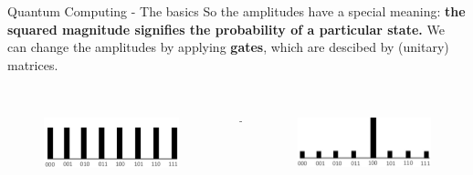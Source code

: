 \documentclass{beamer}
\begin{document}
{\begin{frame}{Quantum Computing - The basics}
	So the amplitudes have a special meaning: \textbf{the squared magnitude signifies the probability of a particular state.} We can change the amplitudes by applying \textbf{gates}, which are descibed by (unitary) matrices.\\~\\
	
	\pause
	\begin{columns}
		\begin{column}{0.4\textwidth}  %
			\begin{figure}[b]
				\includegraphics[width=\textwidth]{figures/superposition_carmina}
			\end{figure}
		\end{column}
		\begin{column}{0.1\textwidth}
			$$\longrightarrow$$
		\end{column}
		\begin{column}{0.4\textwidth}  %
			
			\begin{figure}[b]
				\includegraphics[width=\textwidth]{figures/superposition_carmina_2}
			\end{figure}
				
		\end{column}
	\end{columns}
\end{frame}

}
\end{document}
